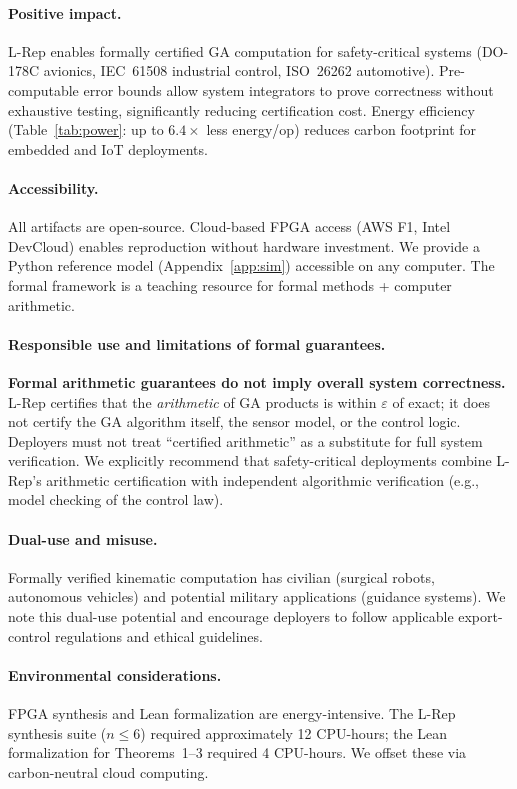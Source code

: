 \documentclass[11pt,a4paper]{article}
\theoremstyle{definition}
\theoremstyle{plain}
\theoremstyle{remark}
\begin{document}
\paragraph{Positive impact.}
L-Rep enables formally certified GA computation for safety-critical systems
(DO-178C avionics, IEC~61508 industrial control, ISO~26262 automotive).
Pre-computable error bounds allow system integrators to prove correctness
without exhaustive testing, significantly reducing certification cost.
Energy efficiency (Table~\ref{tab:power}: up to $6.4\times$ less energy/op)
reduces carbon footprint for embedded and IoT deployments.

\paragraph{Accessibility.}
All artifacts are open-source.
Cloud-based FPGA access (AWS F1, Intel DevCloud) enables reproduction
without hardware investment.
We provide a Python reference model (Appendix~\ref{app:sim})
accessible on any computer.
The formal framework is a teaching resource for formal methods + computer arithmetic.

\paragraph{Responsible use and limitations of formal guarantees.}
\textbf{Formal arithmetic guarantees do not imply overall system correctness.}
L-Rep certifies that the \emph{arithmetic} of GA products is within
$\varepsilon$ of exact; it does not certify the GA algorithm itself,
the sensor model, or the control logic.
Deployers must not treat ``certified arithmetic'' as a substitute for
full system verification.
We explicitly recommend that safety-critical deployments combine
L-Rep's arithmetic certification with independent algorithmic
verification (e.g., model checking of the control law).

\paragraph{Dual-use and misuse.}
Formally verified kinematic computation has civilian (surgical robots,
autonomous vehicles) and potential military applications (guidance systems).
We note this dual-use potential and encourage deployers to follow
applicable export-control regulations and ethical guidelines.

\paragraph{Environmental considerations.}
FPGA synthesis and Lean formalization are energy-intensive.
The L-Rep synthesis suite ($n\le 6$) required approximately 12 CPU-hours;
the Lean formalization for Theorems~1--3 required 4 CPU-hours.
We offset these via carbon-neutral cloud computing.
\end{document}
